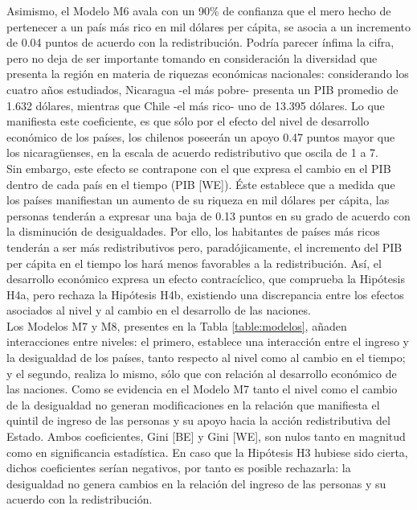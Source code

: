 \documentclass[12pt,letterpaper]{article}
\begin{document}
Asimismo, el Modelo M6 avala con un 90\% de confianza que el mero hecho de pertenecer a un país más rico en mil dólares per cápita, se asocia a un incremento de 0.04 puntos de acuerdo con la redistribución. Podría parecer ínfima la cifra, pero no deja de ser importante tomando en consideración la diversidad que presenta la región en materia de riquezas económicas nacionales: considerando los cuatro años estudiados, Nicaragua -el más pobre- presenta un PIB promedio de 1.632 dólares, mientras que Chile -el más rico- uno de 13.395 dólares. Lo que manifiesta este coeficiente, es que sólo por el efecto del nivel de desarrollo económico de los países, los chilenos poseerán un apoyo 0.47 puntos mayor que los nicaragüenses, en la escala de acuerdo redistributivo que oscila de 1 a 7. \\

Sin embargo, este efecto se contrapone con el que expresa el cambio en el PIB dentro de cada país en el tiempo (PIB [WE]). Éste establece que a medida que los países manifiestan un aumento de su riqueza en mil dólares per cápita, las personas tenderán a expresar una baja de 0.13 puntos en su grado de acuerdo con la disminución de desigualdades. Por ello, los habitantes de países más ricos tenderán a ser más redistributivos pero, paradójicamente, el incremento del PIB per cápita en el tiempo los hará menos favorables a la redistribución. Así, el desarrollo económico expresa un efecto contracíclico, que comprueba la Hipótesis H4a, pero rechaza la Hipótesis H4b, existiendo una discrepancia entre los efectos asociados al nivel y al cambio en el desarrollo de las naciones.\\

Los Modelos M7 y M8, presentes en la Tabla \ref{table:modelos}, añaden interacciones entre niveles: el primero, establece una interacción entre el ingreso y la desigualdad de los países, tanto respecto al nivel como al cambio en el tiempo; y el segundo, realiza lo mismo, sólo que con relación al desarrollo económico de las naciones. Como se evidencia en el Modelo M7 tanto el nivel como el cambio de la desigualdad no generan modificaciones en la relación que manifiesta el quintil de ingreso de las personas y su apoyo hacia la acción redistributiva del Estado. Ambos coeficientes, Gini [BE] y Gini [WE], son nulos tanto en magnitud como en significancia estadística. En caso que la Hipótesis H3 hubiese sido cierta, dichos coeficientes serían negativos, por tanto es posible rechazarla: la desigualdad no genera cambios en la relación del ingreso de las personas y su acuerdo con la redistribución.\\
\end{document}
